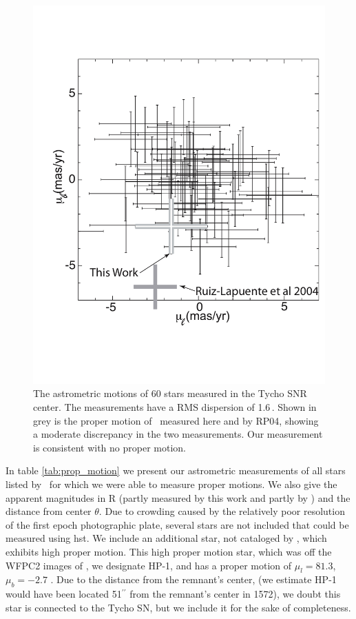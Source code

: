 \begin{figure}[h!]
	\centering
	\includegraphics[width=\textwidth]{chapter_sn1572_starg/plots/prop_motion_compare_subaru.pdf}
\caption{The astrometric motions of 60 stars measured in the Tycho SNR
center. The measurements have a RMS dispersion of 1.6\,\masyr. Shown
in grey is the proper motion of \starg\ measured here and by RP04, showing a moderate discrepancy in the two measurements. Our measurement is consistent with no proper motion. }
\label{fig:prop_motion}
\end{figure}

In table \ref{tab:prop_motion} we present our astrometric measurements of all stars listed by \rl\  for which we were able to measure proper motions. We also give the apparent magnitudes in R (partly measured by this work and partly by \rl) and the distance from center $\theta$. Due to crowding caused by the relatively poor resolution of the first epoch photographic plate, several stars are not included that could be measured using \gls{hst}.
We include an  additional star, not cataloged by \rl, which exhibits high proper motion. This  high proper motion star, which was off the WFPC2 images of \rl,  we designate HP-1, and has a proper motion of $\mu_l=81.3$, $\mu_b=-2.7$ \masyr. Due to the distance from the remnant's center, (we estimate HP-1 would have been located 51$^{\prime\prime}$ from the remnant's center in 1572), we doubt this star is connected to the Tycho SN, but we include it for the sake of completeness. 

